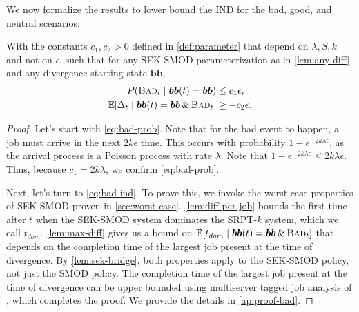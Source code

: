 \documentclass[acmsmall]{acmart}
\newcommand{\E}[1]{\mathbb{E}[#1]}
\newcommand{\bb}{\boldsymbol{b}}
\newcommand{\bbb}{\bb\bb}
\newcommand{\bad}{\textsc{Bad}}
\begin{document}
We now formalize the results to lower bound the IND for the bad, good, and neutral scenarios:

\begin{lemma}
    \label{lem:bad}
    With the constants $c_1, c_2 > 0$ defined in \cref{def:parameter} that depend on $\lambda, S, k$ and not on $\epsilon$, such that for any SEK-SMOD parameterization as in \cref{lem:any-diff} and any divergence starting state $\bbb$,
    \begin{align}
    \label{eq:bad-prob}
        P(\bad_t \mid \bbb(t) = \bbb) &\le c_1 \epsilon,    \\
    \label{eq:bad-ind}
        \E{\Delta_t \mid\bbb(t) = \bbb \,\&\, \bad_t} &\ge - c_2 \epsilon.
    \end{align}
\end{lemma}
\begin{proof}
    Let's start with \eqref{eq:bad-prob}. 
    Note that for the bad event to happen,
    a job must arrive in the next $2k\epsilon$ time.
    This occurs with probability $1 - e^{-{2k\lambda \epsilon }}$, as the arrival process is a Poisson process with rate $\lambda$. Note that $1 - e^{-{2k\lambda\epsilon}} \le 2k\lambda \epsilon$. 
    Thus, because $c_1 = 2k\lambda$, we confirm \eqref{eq:bad-prob}.

    Next, let's turn to \eqref{eq:bad-ind}.
    To prove this, we invoke the worst-case properties of SEK-SMOD proven in \cref{sec:worst-case}.
    \cref{lem:diff-per-job} bounds the first time after $t$ when the SEK-SMOD system dominates the SRPT-$k$ system, which we call $t_{dom}$. \cref{lem:max-diff} gives us a bound on $\E{t_{dom} \mid\bbb(t) = \bbb \,\&\, \bad_t}$ that depends on the completion time of the largest job present at the time of divergence.
    By \cref{lem:sek-bridge}, both properties apply to the SEK-SMOD policy, not just the SMOD policy.
    The completion time of the largest job present at the time of divergence can be upper bounded using multiserver tagged job analysis of \cite{grosof-etal-2019-srpt-k}, which completes the proof. We provide the details in \cref{ap:proof-bad}.
\end{proof}
\end{document}
